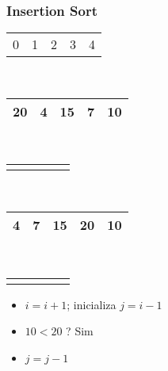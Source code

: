 \documentclass{beamer}
\begin{document}
\begin{frame}
    \frametitle{Insertion Sort}
    \begin{center}
        \begin{table}
            \begin{tabular}{p{0.25cm} p{0.25cm} p{0.25cm} p{0.25cm} p{0.25cm}}
                0 & 1 & 2 & 3 & 4
            \end{tabular} \\
            \begin{tabular}{| p{0.25cm} | p{0.25cm} | p{0.25cm} | p{0.25cm} | p{0.25cm} |}
                \hline
                20 & 4 & 15 & 7 & 10 \\ \hline
            \end{tabular} \\
            \begin{tabular}{p{0.25cm} p{0.25cm} p{0.25cm} p{0.25cm} p{0.25cm}}
                & & & & \color{blue}{$\updownarrow$}
            \end{tabular} \\
            \begin{tabular}{| p{0.25cm} | p{0.25cm} | p{0.25cm} | p{0.25cm} | p{0.25cm} |}
                \hline
                4 & 7 & 15 & 20 & 10 \\ \hline
            \end{tabular} \\
            \begin{tabular}{p{0.25cm} p{0.25cm} p{0.25cm} p{0.25cm} p{0.25cm}}
                & & & \color{red}{$\uparrow$} & \color{blue}{$\uparrow$}
            \end{tabular}
        \end{table}
	\end{center}
    \begin{itemize}[<+->]
        \item $i = i + 1$; inicializa $j = i - 1$
        \item $10 < 20$ ? Sim
        \item $j = j - 1$
    \end{itemize}
\end{frame}
\end{document}
